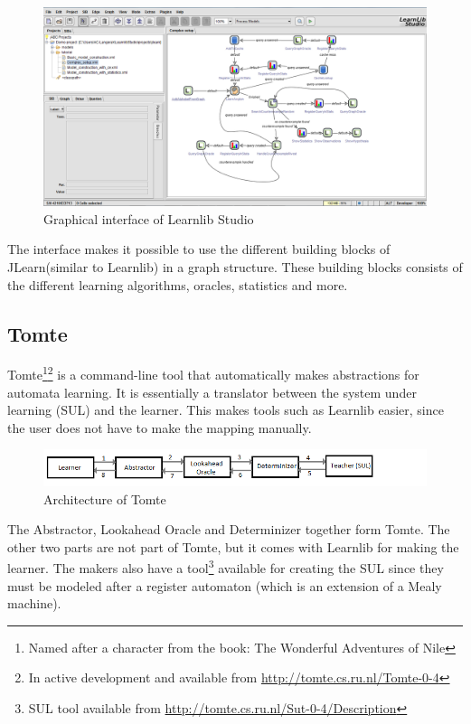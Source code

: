 \documentclass[multi,crop=false,class=article]{standalone}
\begin{document}
	\begin{figure}[H]
		\includegraphics[width=\textwidth]{Tool_images/learnlib_studio_interface.png}
		\caption{Graphical interface of Learnlib Studio}
		\label{fig:learnlib_studio}
	\end{figure}
	
	The interface makes it possible to use the different 
	building blocks of JLearn(similar to Learnlib) in a graph structure. These 
	building blocks consists of the different learning algorithms, oracles, 
	statistics and more. 


\subsection{Tomte}
\label{ssec:tomte}

Tomte\footnote{Named after a character from the book: The Wonderful Adventures 
of Nile}\footnote{In active development and available from
\url{http://tomte.cs.ru.nl/Tomte-0-4}} is a command-line tool that 
automatically makes abstractions for automata learning.  It is essentially a 
translator between the system under learning (SUL) and the learner. This makes 
tools such as Learnlib easier, since the user does not have to make the mapping 
manually.

\begin{figure}[!h]
	\includegraphics[width=\textwidth]{Tool_images/tomte_network.png}
	\caption{Architecture of Tomte}
	\label{fig:tomte_arch_interaction}
\end{figure}

The Abstractor, Lookahead Oracle and Determinizer together form Tomte. The
other two parts are not part of Tomte, but it comes with Learnlib for making
the learner. The makers also have a tool\footnote{SUL tool available from
\url{http://tomte.cs.ru.nl/Sut-0-4/Description}} available for creating the SUL
since they must be modeled after a register automaton\cite{Aarts2015}
(which is an extension of a Mealy machine).
\end{document}
